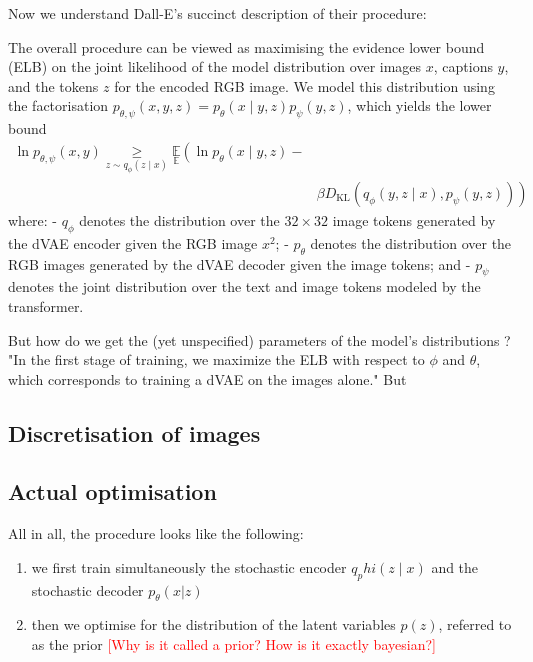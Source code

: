 \documentclass{article}
\begin{document}
\begin{appendix}
Now we understand Dall-E's succinct description of their procedure:
\begin{displayquote}
The overall procedure can be viewed as maximising the evidence lower bound (ELB) on the joint likelihood of the model distribution over images $x$, captions $y$, and the tokens $z$ for the encoded RGB image. We model this distribution using the factorisation $p_{\theta, \psi}(x, y, z)=p_{\theta}(x \mid y, z) p_{\psi}(y, z)$, which yields the lower bound
$$
\begin{aligned}
\ln p_{\theta, \psi}(x, y) \underset{z \sim q_{\phi}(z \mid x)}{\geqslant} \underset{\mathbb{E}}{\mathbb{E}}\left(\ln p_{\theta}(x \mid y, z)-\right.\\
&\left.\beta D_{\mathrm{KL}}\left(q_{\phi}(y, z \mid x), p_{\psi}(y, z)\right)\right)
\end{aligned}
$$
where:
- $q_{\phi}$ denotes the distribution over the $32 \times 32$ image tokens generated by the dVAE encoder given the RGB image $x^{2}$;
- $p_{\theta}$ denotes the distribution over the RGB images generated by the dVAE decoder given the image tokens; and
- $p_{\psi}$ denotes the joint distribution over the text and image tokens modeled by the transformer.
\end{displayquote}

But how do we get the (yet unspecified) parameters of the model's  distributions ? "In the first stage of training, we maximize the ELB with respect to $\phi$ and $\theta$, which corresponds to training a dVAE on the images alone." But 

\subsection{Discretisation of images}


\subsection{Actual optimisation}

All in all, the procedure looks like the following:
\begin{enumerate}
    \item we first train simultaneously the stochastic encoder $q_phi(z \mid x)$ and the stochastic decoder $p_\theta(x|z)$
    \item then we optimise for the distribution of the latent variables $p(z)$, referred to as the prior \textcolor{red}{[Why is it called a prior? How is it exactly bayesian?]}
\end{enumerate}




\end{appendix}
\end{document}
